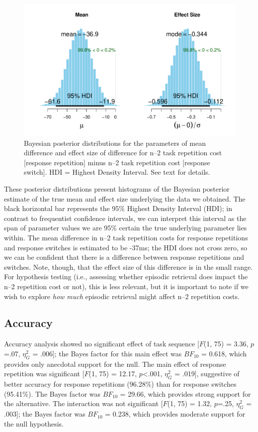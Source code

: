 \documentclass[a4paper, doc, natbib]{apa6}
\begin{document}
\begin{figure}
\begin{center}
\includegraphics[width =\textwidth]{Images/bayesParameter.pdf}
\caption{Bayesian posterior distributions for the parameters of mean difference and effect size of difference for n--2 task repetition cost [response repetition] minus n--2 task repetition cost [response switch]. HDI = Highest Density Interval. See text for details.}
\label{fig:bayesParameter}
\end{center}
\end{figure}

These posterior distributions present histograms of the Bayesian posterior estimate of the true mean and effect size underlying the data we obtained. The black horizontal bar represents the 95\% Highest Density Interval (HDI); in contrast to frequentist confidence intervals, we can interpret this interval as the span of parameter values we are 95\% certain the true underlying parameter lies within. The mean difference in n--2 task repetition costs for response repetitions and response switches is estimated to be -37ms; the HDI does not cross zero, so we can be confident that there is a difference between response repetitions and switches. Note, though, that the effect size of this difference is in the small range. For hypothesis testing (i.e., assessing whether episodic retrieval does impact the n--2 repetition cost or not), this is less relevant, but it is important to note if we wish to explore \emph{how much} episodic retrieval might affect n--2 repetition costs.

\subsection{Accuracy}
Accuracy analysis showed no significant effect of task sequence [$F$(1, 75) = 3.36, $p$=.07, $\eta_G^2$ = .006]; the Bayes factor for this main effect was $BF_{10}$ = 0.618, which provides only anecdotal support for the null. The main effect of response repetition was significant [$F$(1, 75) = 12.17, $p$<.001, $\eta_G^2$ = .019], suggestive of better accuracy for response repetitions (96.28\%) than for response switches (95.41\%). The Bayes factor was $BF_{10}$ = 29.66, which provides strong support for the alternative. The interaction was not significant [$F$(1, 75) = 1.32, $p$=.25, $\eta_G^2$ = .003]; the Bayes factor was $BF_{10}$ = 0.238, which provides moderate support for the null hypothesis.
\end{document}
